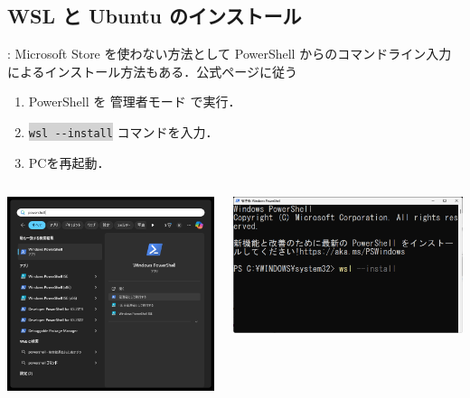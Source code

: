 \documentclass[aspectratio=169,dvipdfmx,cjk]{beamer}
\newcommand{\cmdline}[1]{
    \colorbox{lightgray}{\lstinline[style=command]{#1}}
}
\newcommand{\blue}[1]{ {\color{blue} #1} }
\begin{document}
\subsection*{WSL と Ubuntu のインストール}
\begin{frame}{\insertsection \thesubsection: \insertsubsection}\label{appendix:wsl}
  Microsoft Store を使わない方法として PowerShell からのコマンドライン入力によるインストール方法もある．公式ページ\cite{WSL}に従う
  \begin{enumerate}
    \item PowerShell を\blue{管理者モード}で実行．
    \item \cmdline{wsl --install} コマンドを入力．
    \item PCを再起動．
  \end{enumerate}
  \begin{columns}
    \begin{column}{0.3\textwidth}
        \includegraphics[width=1.0\linewidth]{fig/powershell.png}
    \end{column}
    \begin{column}{0.5\textwidth}
      \includegraphics[width=1.0\linewidth]{fig/wsl-install.png}
    \end{column}
  \end{columns}
\end{frame}
\end{document}
